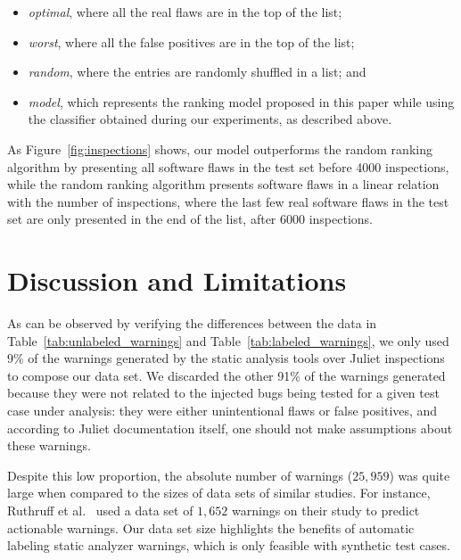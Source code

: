 \begin{itemize}
\item\textit{optimal}, where all the real flaws are in the top of the list;
\item\textit{worst}, where all the false positives are in the top of the list;
\item\textit{random}, where the entries are randomly shuffled in a list; and
\item\textit{model}, which represents the ranking model proposed in this paper while
using the classifier obtained during our experiments, as described above.
\end{itemize}

As Figure~\ref{fig:inspections} shows, our model outperforms the random ranking
algorithm by presenting all software flaws in the test set before 4000
inspections, while the random ranking algorithm presents software flaws in a
linear relation with the number of inspections, where the last few real
software flaws in the test set are only presented in the end of the list, after
6000 inspections.


\section{Discussion and Limitations}
\label{sec:discussion}

As can be observed by verifying the differences between the data in
Table~\ref{tab:unlabeled_warnings} and Table~\ref{tab:labeled_warnings}, we
only used 9\% of the warnings generated by the static analysis tools over
Juliet inspections to compose our data set. We discarded the other 91\% of the
warnings generated because they were not related to the injected bugs being
tested for a given test case under analysis: they were either unintentional
flaws or false positives, and according to Juliet documentation itself, one
should not make assumptions about these warnings.

Despite this low proportion, the absolute number of warnings ($25,959$) was quite large
when compared to the sizes of data sets of similar studies. For instance, Ruthruff et
al.~\cite{ruthruff_predicting_2008} used a data set of $1,652$ warnings on
their study to predict actionable warnings. Our data set size highlights the
benefits of automatic labeling static analyzer warnings, which is only feasible
with synthetic test cases.

